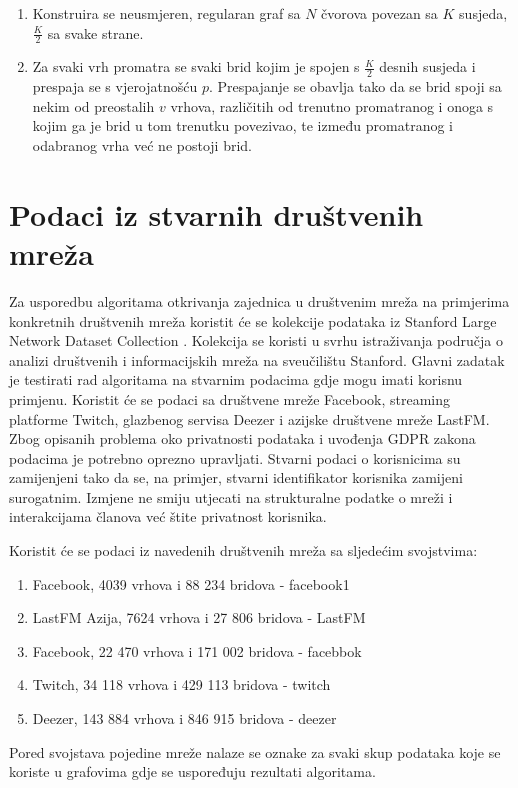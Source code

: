\begin{enumerate}
	\item Konstruira se neusmjeren, regularan graf sa $N$ čvorova povezan sa $K$ susjeda, $\frac{K}{2}$ sa svake strane.
	\item Za svaki vrh promatra se svaki brid kojim je spojen s $\frac{K}{2}$ desnih susjeda i prespaja se s vjerojatnošću $p$. Prespajanje se obavlja tako da se brid spoji sa nekim od preostalih $v$ vrhova, različitih od trenutno promatranog i onoga s kojim ga je brid u tom trenutku povezivao, te između promatranog i odabranog vrha već ne postoji brid.
\end{enumerate}



\section{Podaci iz stvarnih društvenih mreža} \label{real_data}

Za usporedbu algoritama otkrivanja zajednica u društvenim mreža na primjerima konkretnih društvenih mreža koristit će se kolekcije podataka iz Stanford Large Network Dataset Collection \cite{snapnets}. Kolekcija se koristi u svrhu istraživanja područja o analizi društvenih i informacijskih mreža na sveučilištu Stanford. Glavni zadatak je testirati rad algoritama na stvarnim podacima gdje mogu imati korisnu primjenu. Koristit će se podaci sa društvene mreže Facebook, streaming platforme Twitch, glazbenog servisa Deezer i azijske društvene mreže LastFM. Zbog opisanih problema oko privatnosti podataka i uvođenja GDPR zakona podacima je potrebno oprezno upravljati. Stvarni podaci o korisnicima su zamijenjeni tako da se, na primjer, stvarni identifikator korisnika zamijeni surogatnim. Izmjene ne smiju utjecati na strukturalne podatke o mreži i interakcijama članova već štite privatnost korisnika.

Koristit će se podaci iz navedenih društvenih mreža sa sljedećim svojstvima:
\begin{enumerate}
	\item Facebook, 4039 vrhova i 88 234 bridova - facebook1
	\item LastFM Azija, 7624 vrhova i 27 806 bridova - LastFM
	\item Facebook, 22 470 vrhova i 171 002 bridova - facebbok
	\item Twitch, 34 118 vrhova i 429 113 bridova - twitch
	\item Deezer, 143 884 vrhova i 846 915 bridova - deezer
\end{enumerate}
Pored svojstava pojedine mreže nalaze se oznake za svaki skup podataka koje se koriste u grafovima gdje se uspoređuju rezultati algoritama.